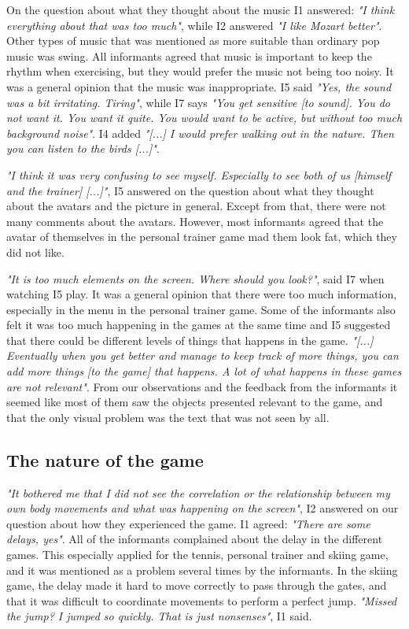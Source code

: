 On the question about what they thought about the music I1 answered: \emph{"I think everything about that was too much"}, while I2 answered \emph{"I like Mozart better"}. Other types of music that was mentioned as more suitable than ordinary pop music was swing. All informants agreed that music is important to keep the rhythm when exercising, but they would prefer the music not being too noisy. It was a general opinion that the music was inappropriate.  I5 said \emph{"Yes, the sound was a bit irritating. Tiring"}, while I7 says \emph{"You get sensitive [to sound]. You do not want it. You want it quite. You would want to be active, but without too much background noise"}. I4 added \emph{"[...] I would prefer walking out in the nature. Then you can listen to the birds [...]"}.

\emph{"I think it was very confusing to see myself. Especially to see both of us [himself and the trainer] [...]"}, I5 answered on the question about what they thought about the avatars and the picture in general. Except from that, there were not many comments about the avatars. However, most informants agreed that the avatar of themselves in the personal trainer game mad them look fat, which they did not like. 

\emph{"It is too much elements on the screen. Where should you look?"}, said I7 when watching I5 play. It was a general opinion that there were too much information, especially in the menu in the personal trainer game. Some of the informants also felt it was too much happening in the games at the same time and I5 suggested that there could be different levels of things that happens in the game. \emph{"[...] Eventually when you get better and manage to keep track of more things, you can add more things [to the game] that happens. A lot of what happens in these games are not relevant"}. From our observations and the feedback from the informants it seemed like most of them saw the objects presented relevant to the game, and that the only visual problem was the text that was not seen by all.

\subsection{The nature of the game}
\emph{"It bothered me that I did not see the correlation or the relationship between my own body movements and what was happening on the screen"}, I2 answered on our question about how they experienced the game. I1 agreed: \emph{"There are some delays, yes"}. All of the informants complained about the delay in the different games. This especially applied for the tennis, personal trainer and skiing game, and it was mentioned as a problem several times by the informants. In the skiing game, the delay made it hard to move correctly to pass through the gates, and that it was difficult to coordinate movements to perform a perfect jump. \emph{"Missed the jump? I jumped so quickly. That is just nonsenses"}, I1 said. 

